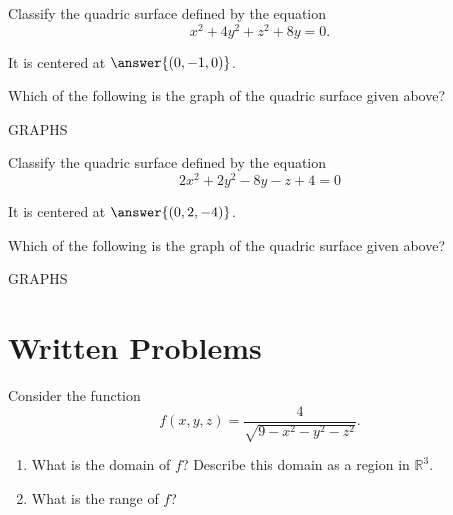 \documentclass{ximera}
\begin{document}
\begin{problem}
Classify the quadric surface defined by the equation
\[
x^2 + 4y^2 + z^2 + 8y = 0.
\]

\begin{multipleChoice}
\end{multipleChoice}

It is centered at $\answer{(0,-1,0)}$.

\begin{problem}
Which of the following is the graph of the quadric surface given above?

GRAPHS
\end{problem}


\end{problem}

\begin{problem}
Classify the quadric surface defined by the equation
\[
2x^2 + 2y^2 - 8y - z + 4 = 0
\]

\begin{multipleChoice}
\end{multipleChoice}

It is centered at $\answer{(0,2,-4)}$.

\begin{problem}
Which of the following is the graph of the quadric surface given above?

GRAPHS
\end{problem}


\end{problem}

\section{Written Problems}
\begin{problem}
Consider the function
\[
f(x,y,z) = \frac{4}{\sqrt{9-x^2-y^2-z^2}}.
\]
\begin{enumerate}
\item What is the domain of $f$? Describe this domain as a region in $\mathbb{R}^3$.
\item What is the range of $f$?
\end{enumerate}
\end{problem}
\end{document}
